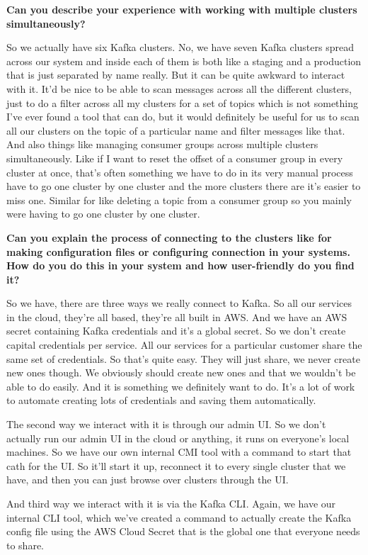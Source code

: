 \textbf{Can you describe your experience with working with multiple clusters simultaneously?}

So we actually have six Kafka clusters. No, we have seven Kafka clusters spread across our system and inside each of them is both like a staging and a production that is just separated by name really. But it can be quite awkward to interact with it. It'd be nice to be able to scan messages across all the different clusters, just to do a filter across all my clusters for a set of topics which is not something I've ever found a tool that can do, but it would definitely be useful for us to scan all our clusters on the topic of a particular name and filter messages like that. And also things like managing consumer groups across multiple clusters simultaneously. Like if I want to reset the offset of a consumer group in every cluster at once, that's often something we have to do in its very manual process have to go one cluster by one cluster and the more clusters there are it's easier to miss one. Similar for like deleting a topic from a consumer group so you mainly were having to go one cluster by one cluster. 

\textbf{Can you explain the process of connecting to the clusters like for making configuration files or configuring connection in your systems. How do you do this in your system and how user-friendly do you find it? }

So we have, there are three ways we really connect to Kafka. So all our services in the cloud, they're all based, they're all built in AWS. And we have an AWS secret containing Kafka credentials and it's a global secret. So we don't create capital credentials per service. All our services for a particular customer share the same set of credentials. So that's quite easy. They will just share, we never create new ones though. We obviously should create new ones and that we wouldn't be able to do easily. And it is something we definitely want to do. It's a lot of work to automate creating lots of credentials and saving them automatically.

The second way we interact with it is through our admin UI. So we don't actually run our admin UI in the cloud or anything, it runs on everyone's local machines. So we have our own internal CMI tool with a command to start that cath for the UI. So it'll start it up, reconnect it to every single cluster that we have, and then you can just browse over clusters through the UI. 

And third way we interact with it is via the Kafka CLI. Again, we have our internal CLI tool, which we've created a command to actually create the Kafka config file using the AWS Cloud Secret that is the global one that everyone needs to share.

